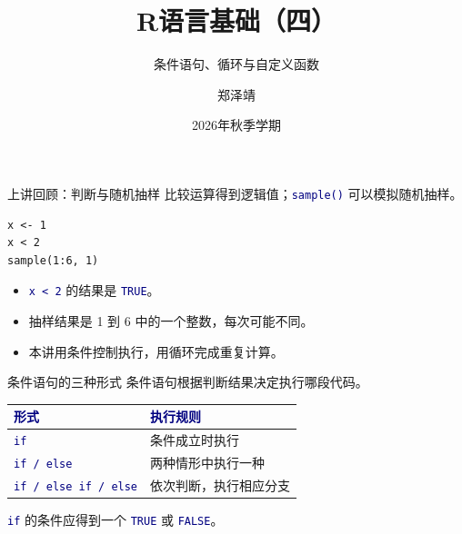 \documentclass[14pt,compress,t,noamsthm,notheorem,table,handout,fontset=none]{ctexbeamer}
\title{R语言基础（四）}
\subtitle{条件语句、循环与自定义函数}
\author{郑泽靖}
\institute{北京师范大学统计学院}
\date{2026年秋季学期}
\newcommand{\code}[1]{\textcolor{navy}{\texttt{#1}}}
\newcommand{\inputlabel}{\par\smallskip{\fontsize{10.5}{13}\selectfont\bfseries\color{muted}输入代码\par}}
\newcommand{\thead}[1]{\textcolor{navy}{\textbf{#1}}}
\begin{document}
\begin{frame}[plain]
  \titlepage
\end{frame}

\begin{frame}[fragile]{上讲回顾：判断与随机抽样}
  \small
  比较运算得到逻辑值；\code{sample()} 可以模拟随机抽样。
  \inputlabel
\begin{lstlisting}
x <- 1
x < 2
sample(1:6, 1)
\end{lstlisting}
  \begin{itemize}
    \item \code{x < 2} 的结果是 \code{TRUE}。
    \item 抽样结果是 1 到 6 中的一个整数，每次可能不同。
    \item 本讲用条件控制执行，用循环完成重复计算。
  \end{itemize}
\end{frame}

\begin{frame}{条件语句的三种形式}
  条件语句根据判断结果决定执行哪段代码。
  \par\vspace{0.4em}
  \renewcommand{\arraystretch}{1.45}
  \begin{tabular*}{\linewidth}{@{\extracolsep{\fill}}ll@{}}
    \toprule
    \thead{形式} & \thead{执行规则} \\
    \midrule
    \code{if} & 条件成立时执行 \\
    \code{if / else} & 两种情形中执行一种 \\
    \code{if / else if / else} & 依次判断，执行相应分支 \\
    \bottomrule
  \end{tabular*}
  \par\vspace{0.5em}
  \code{if} 的条件应得到一个 \code{TRUE} 或 \code{FALSE}。
\end{frame}
\end{document}
